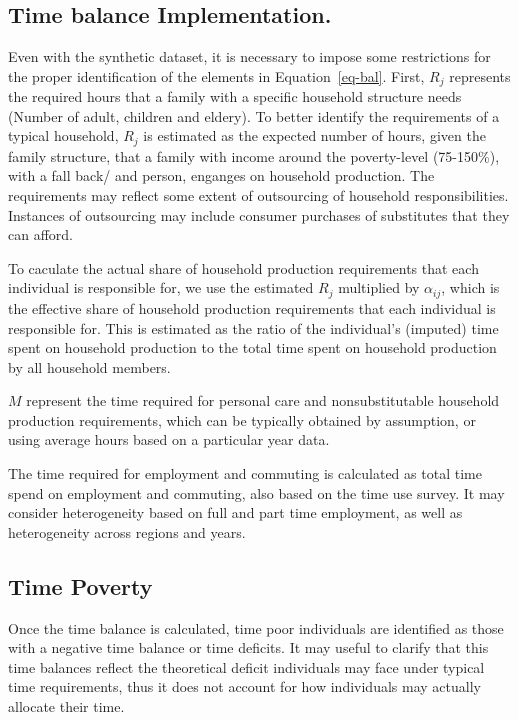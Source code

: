 \documentclass[
  11pt,
]{article}
\begin{document}
\subsection{Time balance
Implementation.}\label{time-balance-implementation.}

Even with the synthetic dataset, it is necessary to impose some
restrictions for the proper identification of the elements in
Equation~\ref{eq-bal}. First, \(R_j\) represents the required hours that
a family with a specific household structure needs (Number of adult,
children and eldery). To better identify the requirements of a typical
household, \(R_j\) is estimated as the expected number of hours, given
the family structure, that a family with income around the poverty-level
(75-150\%), with a fall back/ and person, enganges on household
production. The requirements may reflect some extent of outsourcing of
household responsibilities. Instances of outsourcing may include
consumer purchases of substitutes that they can afford.

To caculate the actual share of household production requirements that
each individual is responsible for, we use the estimated \(R_j\)
multiplied by \(\alpha_{ij}\), which is the effective share of household
production requirements that each individual is responsible for. This is
estimated as the ratio of the individual's (imputed) time spent on
household production to the total time spent on household production by
all household members.

\(M\) represent the time required for personal care and nonsubstitutable
household production requirements, which can be typically obtained by
assumption, or using average hours based on a particular year data.

The time required for employment and commuting is calculated as total
time spend on employment and commuting, also based on the time use
survey. It may consider heterogeneity based on full and part time
employment, as well as heterogeneity across regions and years.

\subsection{Time Poverty}\label{time-poverty}

Once the time balance is calculated, time poor individuals are
identified as those with a negative time balance or time deficits. It
may useful to clarify that this time balances reflect the theoretical
deficit individuals may face under typical time requirements, thus it
does not account for how individuals may actually allocate their time.
\end{document}
